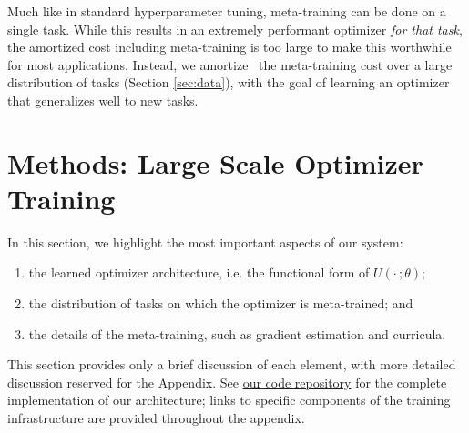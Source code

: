 \documentclass[11pt]{article}
\begin{document}
Much like in standard hyperparameter tuning, meta-training can be done on a single task.
While this results in an extremely performant optimizer \emph{for that task}, the amortized cost 
including meta-training is too large to make 
this worthwhile for most applications. 
Instead, we amortize~\citep{amos2022tutorial} the meta-training cost over a large distribution of tasks (Section \ref{sec:data}), with the goal of learning an optimizer that generalizes well to new tasks.

\section{Methods: Large Scale Optimizer Training}
In this section, we highlight the most important aspects of our system: 
\begin{enumerate}
    \item the learned optimizer architecture, i.e. the functional form of $U(\cdot\,; \theta)$;
    \item the distribution of tasks on which the optimizer is meta-trained; and
    \item the details of the meta-training, such as gradient estimation and curricula.
\end{enumerate}
This section provides only a brief discussion of each element, with more detailed discussion reserved for the Appendix. 
See \href{https://github.com/google/learned_optimization/blob/main/learned_optimization/learned_optimizers/adafac_mlp_lopt.py}{our code repository} for the complete implementation of our architecture; links to specific components of the training infrastructure are provided throughout the appendix.
\end{document}
